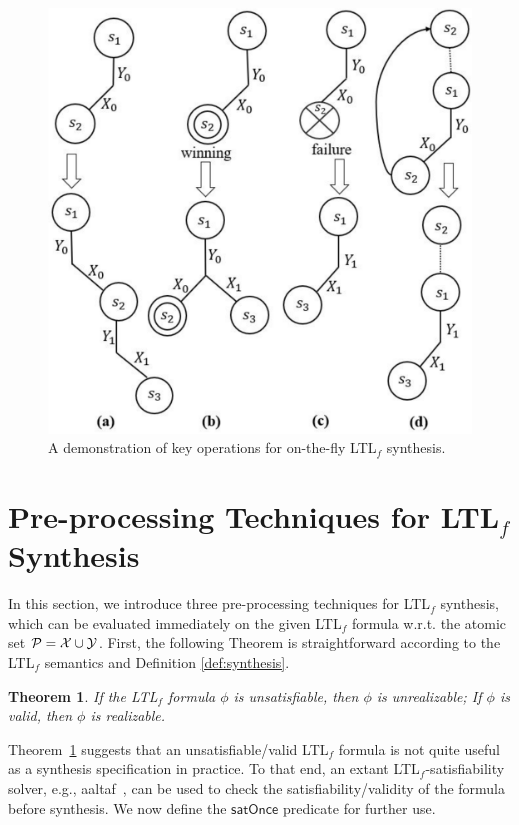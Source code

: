 \documentclass[letterpaper]{article} %
\newcommand{\ltlf}{\textsf{LTL}$_f$\xspace}
\newtheorem{theorem}{Theorem}
\def\satOnce{\mathsf{satOnce}\xspace}
\newcommand{\aaltaf}{{\sf aaltaf}\xspace}
\begin{document}
\begin{figure}
    \centering
    \includegraphics[scale=0.35]{demonstration.pdf}
    \caption{A demonstration of key operations for on-the-fly \ltlf synthesis.}
    \label{fig:demonstration}
\end{figure}




%
\section{Pre-processing Techniques for \ltlf Synthesis}
In this section, we introduce three pre-processing techniques for \ltlf synthesis, which can be evaluated immediately on the given \ltlf formula w.r.t. the atomic set $\mathcal{P}=\mathcal{X}\cup\mathcal{Y}$. First, the following Theorem is straightforward according to the \ltlf semantics and Definition \ref{def:synthesis}.

\begin{theorem}\label{thm:sat-syn}
	If the \ltlf formula $\phi$ is unsatisfiable, then $\phi$ is unrealizable; If $\phi$ is valid, then $\phi$ is realizable.
\end{theorem}
Theorem~\ref{thm:sat-syn} suggests that an unsatisfiable/valid \ltlf formula is not quite useful as a synthesis specification in practice. 
To that end, an extant \ltlf-satisfiability solver, e.g., \aaltaf~\cite{LRPZV19}, can be used to check the satisfiability/validity of the formula before synthesis. We now define the $\satOnce$ predicate for further use. 
\end{document}
